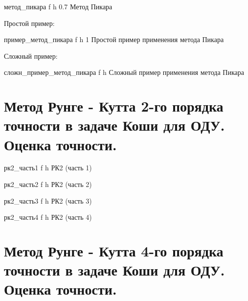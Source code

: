 \clearpage

{метод_пикара} %
{f} %
{h} %
{0.7\textwidth} %
{Метод Пикара}

Простой пример: 

{пример_метод_пикара} %
{f} %
{h} %
{1\textwidth} %
{Простой пример применения метода Пикара}

Сложный пример: 

{сложн_пример_метод_пикара} %
{f} %
{h} %
{\textwidth} %
{Сложный пример применения метода Пикара}

\clearpage

\section*{Метод Рунге - Кутта 2-го порядка точности в задаче Коши для ОДУ. Оценка точности.} %


{рк2_часть1} %
{f} %
{h} %
{\textwidth} %
{РК2 (часть 1)}

{рк2_часть2} %
{f} %
{h} %
{\textwidth} %
{РК2 (часть 2)}

{рк2_часть3} %
{f} %
{h} %
{\textwidth} %
{РК2 (часть 3)}

{рк2_часть4} %
{f} %
{h} %
{\textwidth} %
{РК2 (часть 4)}

\section*{Метод Рунге - Кутта 4-го порядка точности в задаче Коши для ОДУ. Оценка точности.} %

